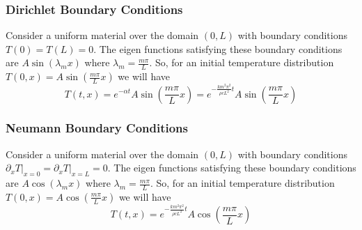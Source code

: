 \documentclass[letterpaper,12pt]{article}
\begin{document}
\subsubsection{Dirichlet Boundary Conditions}
Consider a uniform material over the domain $(0,L)$ with boundary conditions $T(0) = T(L) = 0$. The eigen functions satisfying these boundary
conditions are $A \sin(\lambda_m x)$ where $\lambda_m = \frac{m\pi}{L}$. So, for an initial temperature distribution $T(0,x) = A \sin(\frac{m\pi}{L} x)$
we will have
\begin{equation}
T(t,x) = e^{-\alpha t} A \sin\left(\frac{m\pi}{L} x\right) = 
e^{-\frac{k m^2\pi^2}{\rho c L^2} t} A \sin\left(\frac{m\pi}{L} x\right)
\end{equation}

\subsubsection{Neumann Boundary Conditions}
Consider a uniform material over the domain $(0,L)$ with boundary conditions
$\left.\partial_x T \right|_{x = 0} = \left.\partial_x T \right|_{x = L}= 0$.
The eigen functions satisfying these boundary
conditions are $A \cos(\lambda_m x)$ where $\lambda_m = \frac{m\pi}{L}$. So, for an initial temperature distribution $T(0,x) = A \cos(\frac{m\pi}{L} x)$
we will have
\begin{equation}
T(t,x) = 
e^{-\frac{k m^2\pi^2}{\rho c L^2} t} A \cos\left(\frac{m\pi}{L} x\right)
\end{equation}
\end{document}
